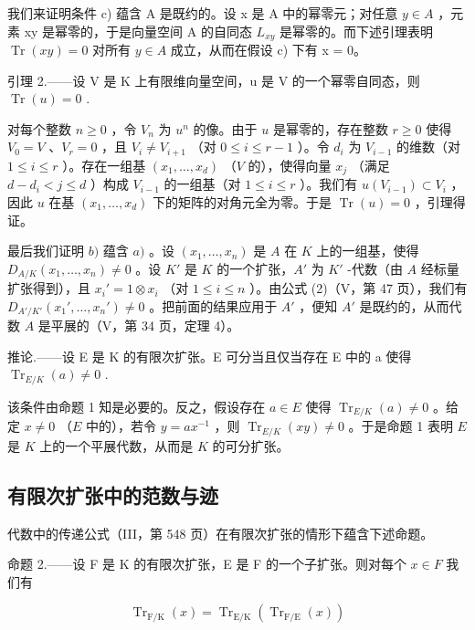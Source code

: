 我们来证明条件 c) 蕴含 A 是既约的。设 x 是 A 中的幂零元；对任意 \(y \in A\) ，元素 xy 是幂零的，于是向量空间 A 的自同态 \(L_{xy}\) 是幂零的。而下述引理表明 \(\operatorname{Tr}(xy) = 0\) 对所有 \(y \in A\) 成立，从而在假设 c) 下有 x = 0。

引理 2.——设 V 是 K 上有限维向量空间，u 是 V 的一个幂零自同态，则 \(\operatorname{Tr}(u)=0\) .

对每个整数 \(n \geqslant 0\) ，令 \(V_n\) 为 \(u^n\) 的像。由于 \(u\) 是幂零的，存在整数 \(r \geqslant 0\) 使得 \(V_0 = V\) 、\(V_r = 0\) ，且 \(V_i \neq V_{i+1}\) （对 \(0 \leqslant i \leqslant r-1\) ）。令 \(d_i\) 为 \(V_{i-1}\) 的维数（对 \(1 \leqslant i \leqslant r\) ）。存在一组基 \((x_1, \ldots, x_d)\) （\(V\) 的），使得向量 \(x_j\) （满足 \(d - d_i < j \leqslant d\) ）构成 \(V_{i-1}\) 的一组基（对 \(1 \leqslant i \leqslant r\) ）。我们有 \(u(V_{i-1}) \subset V_i\) ，因此 \(u\) 在基 \((x_1, \ldots, x_d)\) 下的矩阵的对角元全为零。于是 \(\operatorname{Tr}(u) = 0\) ，引理得证。

最后我们证明 \(b)\) 蕴含 \(a)\) 。设 \((x_1, \ldots, x_n)\) 是 \(A\) 在 \(K\) 上的一组基，使得 \(D_{A/K}(x_1, \ldots, x_n) \neq 0\) 。设 \(K'\) 是 \(K\) 的一个扩张，\(A'\) 为 \(K'\) -代数（由 \(A\) 经标量扩张得到），且 \(x_i' = 1 \otimes x_i\) （对 \(1 \leqslant i \leqslant n\) ）。由公式 (2)（V，第 47 页），我们有 \(D_{A'/K'}(x_1', \ldots, x_n') \neq 0\) 。把前面的结果应用于 \(A'\) ，便知 \(A'\) 是既约的，从而代数 \(A\) 是平展的（V，第 34 页，定理 4）。

推论.——设 E 是 K 的有限次扩张。E 可分当且仅当存在 E 中的 a 使得 \(\operatorname{Tr}_{E/K}(a) \neq 0\) .

该条件由命题 1 知是必要的。反之，假设存在 \(a \in E\) 使得 \(\operatorname{Tr}_{E/K}(a) \neq 0\) 。给定 \(x \neq 0\) （\(E\) 中的），若令 \(y = ax^{-1}\) ，则 \(\operatorname{Tr}_{E/K}(xy) \neq 0\) 。于是命题 1 表明 \(E\) 是 \(K\) 上的一个平展代数，从而是 \(K\) 的可分扩张。

\subsection{有限次扩张中的范数与迹}

代数中的传递公式（III，第 548 页）在有限次扩张的情形下蕴含下述命题。

命题 2.——设 F 是 K 的有限次扩张，E 是 F 的一个子扩张。则对每个 \(x \in F\) 我们有

\[
\operatorname{Tr} _ {\mathrm{F} / \mathrm{K}} (x) = \operatorname{Tr} _ {\mathrm{E} / \mathrm{K}} (\operatorname{Tr} _ {\mathrm{F} / \mathrm{E}} (x))\tag{6}
\]


